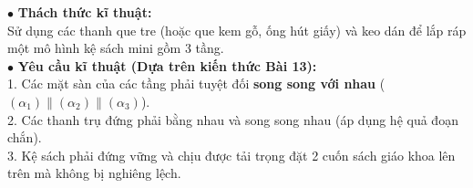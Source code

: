 \documentclass[12pt, a4paper]{article}
\begin{document}
\begin{pedabox}
    $\bullet$ \textbf{Thách thức kĩ thuật:}\\
    Sử dụng các thanh que tre (hoặc que kem gỗ, ống hút giấy) và keo dán để lắp ráp một mô hình kệ sách mini gồm 3 tầng.\\
    $\bullet$ \textbf{Yêu cầu kĩ thuật (Dựa trên kiến thức Bài 13):}\\
    1. Các mặt sàn của các tầng phải tuyệt đối \textbf{song song với nhau} ($(\alpha_1) \parallel (\alpha_2) \parallel (\alpha_3)$).\\
    2. Các thanh trụ đứng phải bằng nhau và song song nhau (áp dụng hệ quả đoạn chắn).\\
    3. Kệ sách phải đứng vững và chịu được tải trọng đặt 2 cuốn sách giáo khoa lên trên mà không bị nghiêng lệch.
\end{pedabox}
\end{document}
